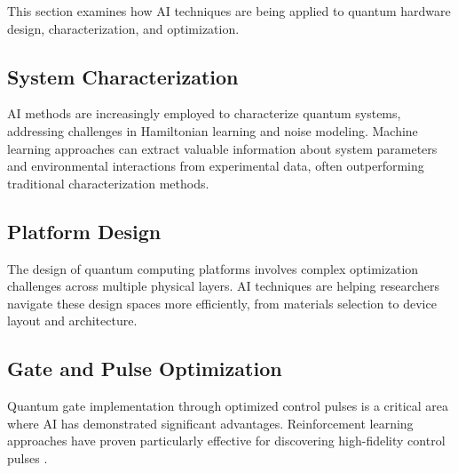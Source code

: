 This section examines how AI techniques are being applied to quantum hardware design, characterization, and optimization.

\subsection{System Characterization}
AI methods are increasingly employed to characterize quantum systems, addressing challenges in Hamiltonian learning \cite{wiebe2014hamiltonian, gentile2021learning} and noise modeling. Machine learning approaches can extract valuable information about system parameters and environmental interactions from experimental data, often outperforming traditional characterization methods.

\subsection{Platform Design}
The design of quantum computing platforms involves complex optimization challenges across multiple physical layers. AI techniques are helping researchers navigate these design spaces more efficiently, from materials selection to device layout and architecture.

\subsection{Gate and Pulse Optimization}
Quantum gate implementation through optimized control pulses is a critical area where AI has demonstrated significant advantages. Reinforcement learning approaches have proven particularly effective for discovering high-fidelity control pulses \cite{bukov2018reinforcement, ding2021breaking}. 